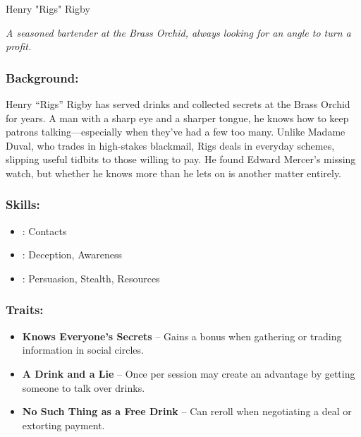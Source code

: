 \begin{WyrdFullNPC}[%
		name=Henry "Rigs" Rigby,%
		description=The Opportunistic Bartender,%
		float=!b%
	]{Henry "Rigs" Rigby}
	
    \emph{A seasoned bartender at the Brass Orchid, always looking for an angle to turn a profit.}
    
    \subsubsection*{Background:}
    Henry “Rigs” Rigby has served drinks and collected secrets at the Brass Orchid for years. A man with a sharp eye and a sharper tongue, he knows how to keep patrons talking—especially when they’ve had a few too many. Unlike Madame Duval, who trades in high-stakes blackmail, Rigs deals in everyday schemes, slipping useful tidbits to those willing to pay. He found Edward Mercer’s missing watch, but whether he knows more than he lets on is another matter entirely.
    
    \subsubsection*{Skills:}
    \begin{itemize}
       \item \Expert: Contacts
        \item \Skilled: Deception, Awareness
        \item \Novice: Persuasion, Stealth, Resources
    \end{itemize}
    
    \subsubsection*{Traits:}
    \begin{itemize}
        \item \textbf{Knows Everyone’s Secrets} – Gains a bonus when gathering or trading information in social circles.
        \item \textbf{A Drink and a Lie} – Once per session may create an advantage by getting someone to talk over drinks.
        \item \textbf{No Such Thing as a Free Drink} – Can reroll when negotiating a deal or extorting payment.
    \end{itemize}
\end{WyrdFullNPC}



